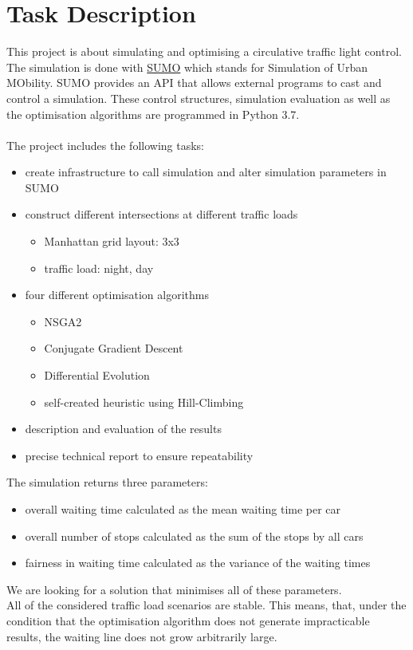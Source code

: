 \documentclass[./\jobname.tex]{subfiles}
\begin{document}
\chapter{Task Description}

This project is about simulating and optimising a circulative traffic light control. The simulation is done with  \href{https://www.dlr.de/ts/en/desktopdefault.aspx/tabid-9883/16931_read-41000/}{SUMO} which stands for Simulation of Urban MObility. SUMO provides an API that allows external programs to cast and control a simulation. These control structures, simulation evaluation as well as the optimisation algorithms are programmed in Python 3.7. \\~\\
The project includes the following tasks: 
\begin{itemize}
	\item create infrastructure to call simulation and alter simulation parameters in SUMO
	\item construct different intersections at different traffic loads
	\begin{itemize}
		\item Manhattan grid layout: 3x3
		\item traffic load: night, day
	\end{itemize}
	\item four different optimisation algorithms
	\begin{itemize}
		\item NSGA2
		\item Conjugate Gradient Descent
		\item Differential Evolution
		\item self-created heuristic using Hill-Climbing
	\end{itemize}
	\item description and evaluation of the results
	\item precise technical report to ensure repeatability 
\end{itemize}

The simulation returns three parameters: 
\begin{itemize}
	\item overall waiting time calculated as the mean waiting time per car
	\item overall number of stops calculated as the sum of the stops by all cars
	\item fairness in waiting time calculated as the variance of the waiting times \\
\end{itemize}
We are looking for a solution that minimises all of these parameters. \\
All of the considered traffic load scenarios are stable. This means, that, under the condition that the optimisation algorithm does not generate impracticable results, the waiting line does not grow arbitrarily large. 
\end{document}
